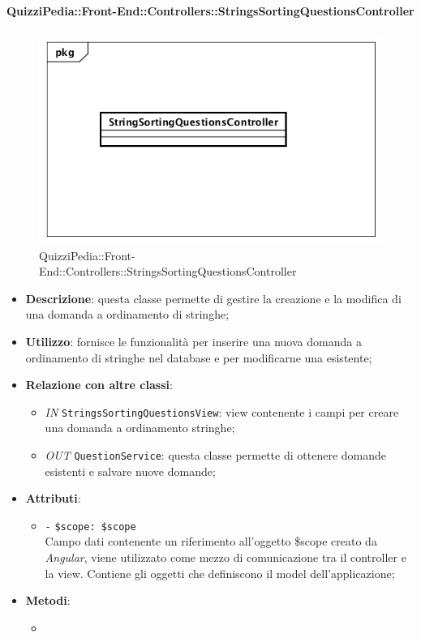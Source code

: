 \paragraph{QuizziPedia::Front-End::Controllers::StringsSortingQuestionsController}
\begin{figure}
	\centering
	\includegraphics[scale=0.45]{UML/Classi/Front-End/QuizziPedia_Front-end_Controller_StringSortingQuestionsController.png}
	\caption{QuizziPedia::Front-End::Controllers::StringsSortingQuestionsController}
\end{figure}
\begin{itemize}
	\item \textbf{Descrizione}: questa classe permette di gestire la creazione e la modifica di una domanda a ordinamento di stringhe;
	\item \textbf{Utilizzo}: fornisce le funzionalità per inserire una nuova domanda a ordinamento di stringhe nel database e per modificarne una esistente;
	\item \textbf{Relazione con altre classi}:
	\begin{itemize}
		\item \textit{IN} \texttt{StringsSortingQuestionsView}: view contenente i campi per creare una domanda a ordinamento stringhe; 
		\item \textit{OUT} \texttt{QuestionService}: questa classe permette di ottenere domande esistenti e salvare nuove domande;
	\end{itemize}
	\item \textbf{Attributi}:
	\begin{itemize}
		\item \texttt{-} \texttt{\$scope: \$scope} \\
		Campo dati contenente un riferimento all’oggetto \$scope creato da \textit{Angular}, viene utilizzato come mezzo di comunicazione tra il controller e la view. Contiene gli oggetti che definiscono il model dell’applicazione;
	\end{itemize}
	\item \textbf{Metodi}:
	\begin{itemize}
		\item 
	\end{itemize}
\end{itemize}

